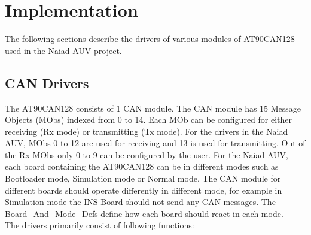 \section{Implementation}\label{sec:implementation}
The following sections describe the drivers of various modules of AT90CAN128 used in the Naiad AUV project.
\subsection{CAN Drivers}
The AT90CAN128 consists of 1 CAN module. The CAN module has 15 Message Objects (MObs) indexed from 0 to 14. Each MOb can be configured for either receiving (Rx mode) or transmitting (Tx mode). For the drivers in the Naiad AUV, MObs 0 to 12 are used for receiving and 13 is used for transmitting. Out of the Rx MObs only 0 to 9 can be configured by the user. For the Naiad AUV, each board containing the AT90CAN128 can be in different modes such as Bootloader mode, Simulation mode or Normal mode. The CAN module for different boards should operate differently in different mode, for example in Simulation mode the INS Board should not send any CAN messages. The Board\_And\_Mode\_Defs define how each board should react in each mode. \\
The drivers primarily consist of following functions:

